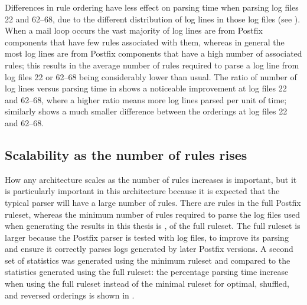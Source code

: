 
Differences in rule ordering have less effect on parsing time when parsing
log files 22 and 62--68, due to the different distribution of log lines in
those log files (see ).
When a mail loop occurs the vast majority of log lines are from Postfix
components that have few rules associated with them, whereas in general the
most log lines are from Postfix components that have a high number of
associated rules; this results in the average number of rules required to
parse a log line from log files 22 or 62--68 being considerably lower than
usual.  The ratio of number of log lines versus parsing time in
 shows a
noticeable improvement at log files 22 and 62--68, where a higher ratio
means more log lines parsed per unit of time; similarly  shows a much smaller difference
between the orderings at log files 22 and 62--68.

\subsection{Scalability as the number of rules rises}

\label{scalability as the number of rules rises}

How any architecture scales as the number of rules increases is important,
but it is particularly important in this architecture because it is
expected that the typical parser will have a large number of rules.  There
are \numberOFrules{} rules in the full Postfix ruleset, whereas the minimum
number of rules required to parse the \numberOFlogFILES{} log files used
when generating the results in this thesis is \numberOFrulesMINIMUM{},
\numberOFrulesMINIMUMpercentage{} of the full ruleset.  The full ruleset is
larger because the Postfix parser is tested with \numberOFlogFILESall{} log
files, to improve its parsing and ensure it correctly parses logs generated
by later Postfix versions.  A second set of statistics was generated using
the minimum ruleset and compared to the statistics generated using the full
ruleset: the percentage parsing time increase when using the full ruleset
instead of the minimal ruleset for optimal, shuffled, and reversed
orderings is shown in .

